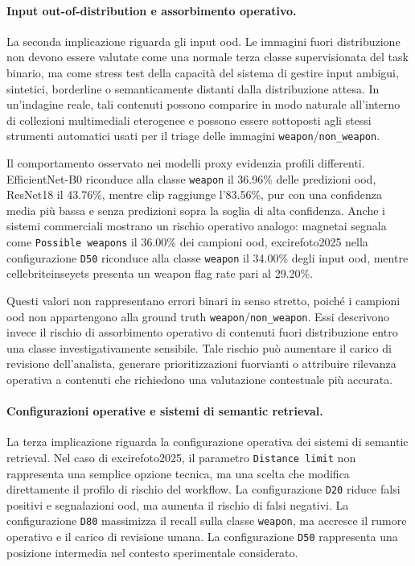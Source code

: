 \paragraph{Input out-of-distribution e assorbimento operativo.}

La seconda implicazione riguarda gli input \gls{ood}. Le immagini fuori
distribuzione non devono essere valutate come una normale terza classe
supervisionata del task binario, ma come stress test della capacità del sistema
di gestire input ambigui, sintetici, borderline o semanticamente distanti dalla
distribuzione attesa. In un'indagine reale, tali contenuti possono comparire in
modo naturale all'interno di collezioni multimediali eterogenee e possono essere
sottoposti agli stessi strumenti automatici usati per il triage delle immagini
\texttt{weapon}/\texttt{non\_weapon}.

Il comportamento osservato nei modelli proxy evidenzia profili differenti.
EfficientNet-B0 riconduce alla classe \texttt{weapon} il 36.96\% delle
predizioni \gls{ood}, ResNet18 il 43.76\%, mentre \gls{clip} raggiunge
l'83.56\%, pur con una confidenza media più bassa e senza predizioni sopra la
soglia di alta confidenza. Anche i sistemi commerciali mostrano un rischio
operativo analogo: \gls{magnetai} segnala come \texttt{Possible weapons} il
36.00\% dei campioni \gls{ood}, \gls{excirefoto2025} nella configurazione
\texttt{D50} riconduce alla classe \texttt{weapon} il 34.00\% degli input
\gls{ood}, mentre \gls{cellebriteinseyets} presenta un weapon flag rate pari al
29.20\%.

Questi valori non rappresentano errori binari in senso stretto, poiché i
campioni \gls{ood} non appartengono alla ground truth
\texttt{weapon}/\texttt{non\_weapon}. Essi descrivono invece il rischio di
assorbimento operativo di contenuti fuori distribuzione entro una classe
investigativamente sensibile. Tale rischio può aumentare il carico di revisione
dell'analista, generare prioritizzazioni fuorvianti o attribuire rilevanza
operativa a contenuti che richiedono una valutazione contestuale più accurata.

\paragraph{Configurazioni operative e sistemi di semantic retrieval.}

La terza implicazione riguarda la configurazione operativa dei sistemi di
semantic retrieval. Nel caso di \gls{excirefoto2025}, il parametro
\texttt{Distance limit} non rappresenta una semplice opzione tecnica, ma una
scelta che modifica direttamente il profilo di rischio del workflow. La
configurazione \texttt{D20} riduce falsi positivi e segnalazioni \gls{ood}, ma
aumenta il rischio di falsi negativi. La configurazione \texttt{D80} massimizza
il recall sulla classe \texttt{weapon}, ma accresce il rumore operativo e il
carico di revisione umana. La configurazione \texttt{D50} rappresenta una
posizione intermedia nel contesto sperimentale considerato.

